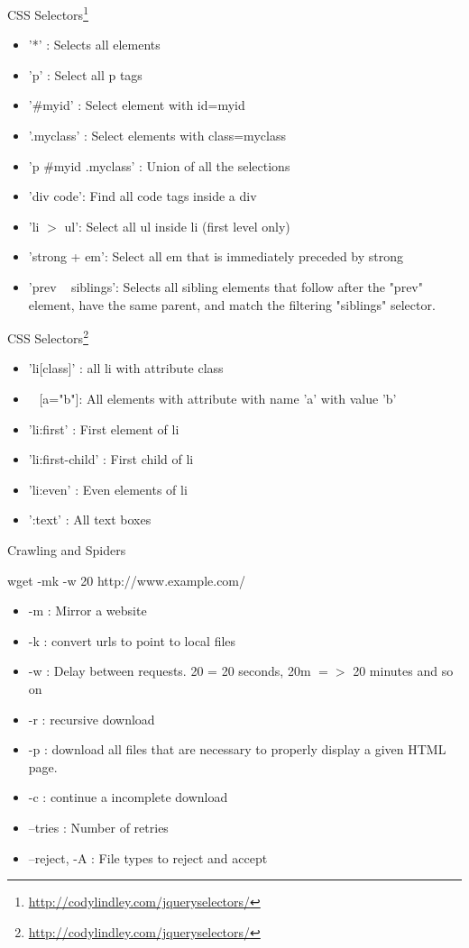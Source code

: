 \documentclass{beamer}
\newcommand{\furl}[1]{{\footnote{\url{#1}}}}
\begin{document}
\begin{frame}{CSS Selectors\furl{http://codylindley.com/jqueryselectors/}}
    \begin{itemize}
        \item '*' : Selects all elements
        \item 'p' : Select all p tags
        \item '\#myid' : Select element with id=myid
        \item '.myclass' : Select elements with class=myclass 
        \item 'p \#myid .myclass' : Union of all the selections
        \item 'div code': Find all code tags inside a div
        \item 'li $>$ ul': Select all ul inside li (first level only)
        \item 'strong + em': Select all em that is immediately preceded by strong
        \item 'prev ~ siblings': Selects all sibling elements that follow after the "prev" element, have the same parent, and match the filtering "siblings" selector. 
    \end{itemize}
\end{frame}
\begin{frame}{CSS Selectors\furl{http://codylindley.com/jqueryselectors/}}
    \begin{itemize}
        \item 'li[class]' : all li with attribute class
        \item ~ [a="b"]: All elements with attribute with name 'a' with value 'b'
        \item 'li:first' : First element of li
        \item 'li:first-child' : First child of li
        \item 'li:even' : Even elements of li
        \item ':text' : All text boxes
    \end{itemize}
\end{frame}

\begin{frame}{Crawling and Spiders}

    wget -mk -w 20 http://www.example.com/
    
    \begin{itemize}
        \item -m : Mirror a website
        \item -k : convert urls to point to local files
        \item -w : Delay between requests. 20 = 20 seconds, 20m $=>$ 20 minutes and so on 
        \item -r : recursive download 
        \item -p : download all files that are necessary to properly display a given HTML page.
        \item -c : continue a incomplete download
        \item --tries : Number of retries
        \item --reject, -A : File types to reject and accept
    \end{itemize}
\end{frame}
\end{document}
